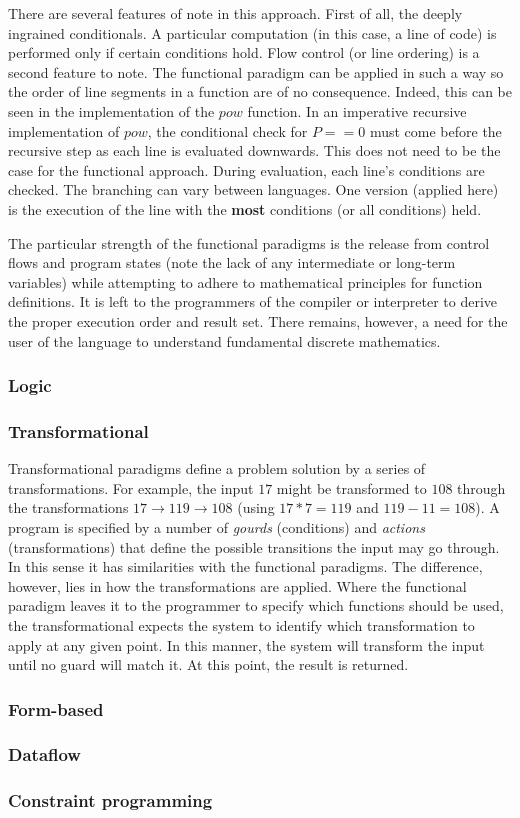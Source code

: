 There are several features of note in this approach. First of all, the deeply ingrained conditionals. A particular computation (in this case, a line of code) is performed only if certain conditions hold. Flow control (or line ordering) is a second feature to note. The functional paradigm can be applied in such a way so the order of line segments in a function are of no consequence. Indeed, this can be seen in the implementation of the $pow$ function. In an imperative recursive implementation of $pow$, the conditional check for $P==0$ must come before the recursive step as each line is evaluated downwards. This does not need to be the case for the functional approach. During evaluation, each line's conditions are checked. The branching can vary between languages. One version (applied here) is the execution of the line with the \textbf{most} conditions (or all conditions) held.

The particular strength of the functional paradigms is the release from control flows and program states (note the lack of any intermediate or long-term variables) while attempting to adhere to mathematical principles for function definitions. It is left to the programmers of the compiler or interpreter to derive the proper execution order and result set. There remains, however, a need for the user of the language to understand fundamental discrete mathematics.

\subsubsection*{Logic}


\subsubsection*{Transformational}
Transformational paradigms define a problem solution by a series of transformations. For example, the input $17$ might be transformed to $108$ through the transformations $17 \rightarrow 119 \rightarrow 108$ (using $17 * 7 = 119$ and $119 - 11 = 108$). A program is specified by a number of \emph{gourds} (conditions) and \emph{actions} (transformations) that define the possible transitions the input may go through. In this sense it has similarities with the functional paradigms. The difference, however, lies in how the transformations are applied. Where the functional paradigm leaves it to the programmer to specify which functions should be used, the transformational expects the system to identify which transformation to apply at any given point. In this manner, the system will transform the input until no guard will match it. At this point, the result is returned.

\subsubsection*{Form-based}


\subsubsection*{Dataflow}


\subsubsection*{Constraint programming}
